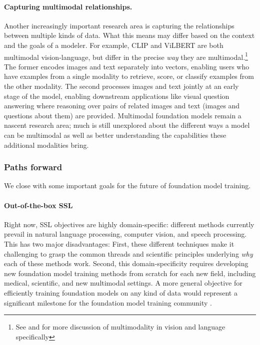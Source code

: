 \paragraph{Capturing multimodal relationships.} Another increasingly important research area is capturing the relationships between multiple kinds of data. What this means may differ based on the context and the goals of a modeler. For example, CLIP \citep{radford2021learning} and ViLBERT \citep{Lu2019ViLBERTPT} are both multimodal vision-language, but differ in the precise \textit{way} they are multimodal.\footnote{See  and  for more discussion of multimodality in vision and language specifically} The former encodes images and text separately into vectors, enabling users who have examples from a single modality to retrieve, score, or classify examples from the other modality. The second processes images and text jointly at an early stage of the model, enabling downstream applications like visual question answering where reasoning over pairs of related images and text (\eg images and questions about them) are provided. Multimodal foundation models remain a nascent research area; much is still unexplored about the different ways a model can be multimodal as well as better understanding the capabilities these additional modalities bring.

\subsubsection{Paths forward}
We close with some important goals for the future of foundation model training.

\paragraph{Out-of-the-box SSL} Right now, SSL objectives are highly domain-specific: different methods currently prevail in natural language processing, computer vision, and speech processing. This has two major disadvantages: First, these different techniques make it challenging to grasp the common threads and scientific principles underlying \textit{why} each of these methods work. Second, this domain-specificity requires developing new foundation model training methods from scratch for each new field, including medical, scientific, and new multimodal settings. A more general objective for efficiently training foundation models on any kind of data would represent a significant milestone for the foundation model training community \citep{Tamkin2021DABS}.

